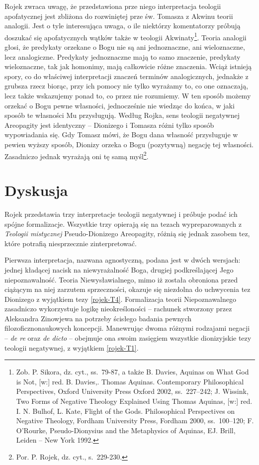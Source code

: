 Rojek zwraca uwagę, że przedstawiona prze niego interpretacja teologii
apofatycznej jest zbliżona do rozwiniętej prze św. Tomasza z Akwinu
teorii analogii. Jest o tyle interesująca uwaga, o ile niektórzy
komentatorzy próbują doszukać się apofatycznych wątków także w teologii
Akwinaty\footnote{Zob. P. Sikora, dz. cyt., ss.~79-87, a także B.
Davies, Aquinas on What God is Not, [w:] red. B. Davies,. Thomas
Aquinas. Contemporary Philosophical Perspectives, Oxford University
Press Oxford 2002, ss.~227–242; J. Wissink, Two Forms of Negative
Theology Explained Using Thomas Aquinas, [w:] red. I. N. Bulhof, L.
Kate, Flight of the Gods. Philosophical Perspectives on Negative
Theology, Fordham University Press, Fordham 2000, ss.~100--120; F.
O'Rourke, Pseudo-Dionysius and the Metaphysics of
Aquinas, EJ. Brill, Leiden -- New York 1992. }. Teoria analogii
głosi, że predykaty orzekane o Bogu nie są ani jednoznaczne, ani
wieloznaczne, lecz analogiczne. Predykaty jednoznaczne mają to samo
znaczenie, predykaty wieloznaczne, tak jak homonimy, mają całkowicie
różne znaczenia. Wciąż istnieją spory, co do właściwej interpretacji
znaczeń terminów analogicznych, jednakże z grubsza  rzecz biorąc, przy
ich pomocy nie tylko wyrażamy to, co one oznaczają, lecz także
wskazujemy ponad to, co przez nie rozumiemy. W ten sposób możemy
orzekać o Bogu pewne własności, jednocześnie nie wiedząc do końca, w
jaki sposób te własności Mu przysługują. Według Rojka, sens teologii
negatywnej Areopagity jest identyczny -- Dionizego i Tomasza różni tylko
sposób wypowiadania się. Gdy Tomasz mówi, że Bogu dana własność
przysługuje w pewien wyższy sposób, Dionizy orzeka o Bogu (pozytywną)
negację tej własności. Zasadniczo jednak wyrażają oni tę samą
myśl\footnote{Por. P. Rojek, dz. cyt., s.~229-230. }.



\section{Dyskusja}

Rojek przedstawia trzy interpretacje teologii negatywnej i próbuje podać
ich spójne formalizacje. Wszystkie trzy opierają się na tezach
wypreparowanych z \textit{Teologii mistycznej} Pseudo-Dionizego
Areopagity, różnią się jednak zasobem tez, które potrafią niesprzecznie
zinterpretować.

Pierwsza interpretacja, nazwana agnostyczną, podana jest w dwóch
wersjach: jednej kładącej nacisk na niewyrażalność Boga, drugiej
podkreślającej Jego niepoznawalność. Teoria Niewysławialnego, mimo iż
została obroniona przed ciążącym na niej zarzutem sprzeczności, okazuje
się niezdolna do uchwycenia tez Dionizego z wyjątkiem tezy \eqref{rojek-T4}.
Formalizacja teorii Niepoznawalnego zasadniczo wykorzystuje logikę
nieokreśloności -- rachunek stworzony przez Aleksandra Zinowjewa na
potrzeby ścisłego badania pewnych filozoficznonaukowych koncepcji.
Manewrując dwoma różnymi rodzajami negacji -- \textit{de re} oraz
\textit{de dicto} -- obejmuje ona swoim zasięgiem wszystkie dionizyjskie
tezy teologii negatywnej, z wyjątkiem \eqref{rojek-T1}.

